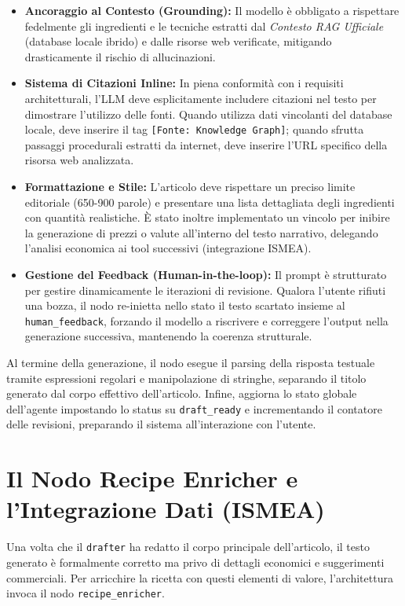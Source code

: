 \documentclass[11pt, a4paper]{article}
\begin{document}
\begin{itemize}
    \item \textbf{Ancoraggio al Contesto (Grounding):} Il modello è obbligato a rispettare fedelmente gli ingredienti e le tecniche estratti dal \textit{Contesto RAG Ufficiale} (database locale ibrido) e dalle risorse web verificate, mitigando drasticamente il rischio di allucinazioni.
    \item \textbf{Sistema di Citazioni Inline:} In piena conformità con i requisiti architetturali, l'LLM deve esplicitamente includere citazioni nel testo per dimostrare l'utilizzo delle fonti. Quando utilizza dati vincolanti del database locale, deve inserire il tag \texttt{[Fonte: Knowledge Graph]}; quando sfrutta passaggi procedurali estratti da internet, deve inserire l'URL specifico della risorsa web analizzata.
    \item \textbf{Formattazione e Stile:} L'articolo deve rispettare un preciso limite editoriale (650-900 parole) e presentare una lista dettagliata degli ingredienti con quantità realistiche. È stato inoltre implementato un vincolo per inibire la generazione di prezzi o valute all'interno del testo narrativo, delegando l'analisi economica ai tool successivi (integrazione ISMEA).
    \item \textbf{Gestione del Feedback (Human-in-the-loop):} Il prompt è strutturato per gestire dinamicamente le iterazioni di revisione. Qualora l'utente rifiuti una bozza, il nodo re-inietta nello stato il testo scartato insieme al \texttt{human\_feedback}, forzando il modello a riscrivere e correggere l'output nella generazione successiva, mantenendo la coerenza strutturale.
\end{itemize}

Al termine della generazione, il nodo esegue il parsing della risposta testuale tramite espressioni regolari e manipolazione di stringhe, separando il titolo generato dal corpo effettivo dell'articolo. Infine, aggiorna lo stato globale dell'agente impostando lo status su \texttt{draft\_ready} e incrementando il contatore delle revisioni, preparando il sistema all'interazione con l'utente.
\section{Il Nodo Recipe Enricher e l'Integrazione Dati (ISMEA)}

Una volta che il \texttt{drafter} ha redatto il corpo principale dell'articolo, il testo generato è formalmente corretto ma privo di dettagli economici e suggerimenti commerciali. Per arricchire la ricetta con questi elementi di valore, l'architettura invoca il nodo \texttt{recipe\_enricher}.
\end{document}
